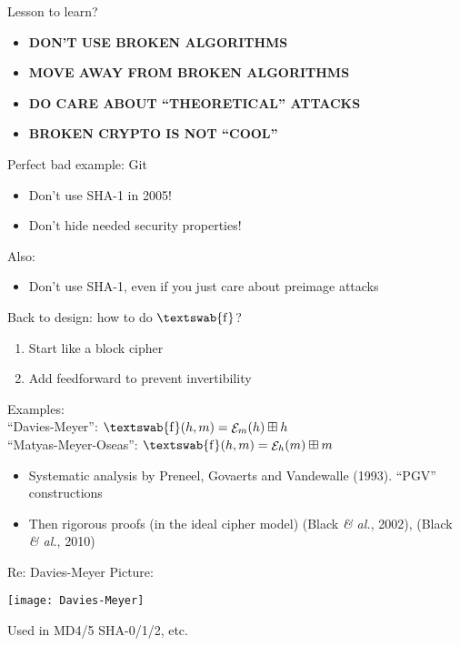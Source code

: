 \documentclass[xcolor=table,usenames,dvipsnames,compress]{beamer}
\newcommand\etal{\emph{\& al.}\xspace}
\DeclareMathOperator\E{\mathcal{E}}
\DeclareMathOperator\cf{\textswab{f}}
\begin{document}
\begin{frame}{Lesson to learn?}
\begin{itemize}
\item \textbf{DON'T USE BROKEN ALGORITHMS}
\item \textbf{MOVE AWAY FROM BROKEN ALGORITHMS}
\item \textbf{DO CARE ABOUT ``THEORETICAL'' ATTACKS}
\item \textbf{BROKEN CRYPTO IS NOT ``COOL''}
\end{itemize}

\medskip

Perfect bad example: Git
\begin{itemize}
\item Don't use SHA-1 in 2005!
\item Don't hide needed security properties!
\end{itemize}

Also:
\begin{itemize}
\item Don't use SHA-1, even if you just care about preimage attacks
\end{itemize}
\end{frame}

\begin{frame}{Back to design: how to do $\cf$?}
\begin{enumerate}
\item Start like a block cipher
\item Add feedforward to prevent invertibility
\end{enumerate}

\medskip

Examples:\\
``Davies-Meyer'': $\cf(h, m) = \E_m(h) \boxplus h$\\
``Matyas-Meyer-Oseas'': $\cf(h, m) = \E_h(m) \boxplus m$

\medskip

\begin{itemize}
\item Systematic analysis by Preneel, Govaerts and Vandewalle (1993). ``PGV'' constructions
\item Then rigorous proofs (in the ideal cipher model) (Black \etal, 2002), (Black \etal, 2010)
\end{itemize}
\end{frame}

\begin{frame}{Re: Davies-Meyer}
Picture:

\medskip

\begin{center}
\texttt{[image: Davies-Meyer]}
\end{center}

\medskip

Used in MD4/5 SHA-0/1/2, etc.
\end{frame}
\end{document}
